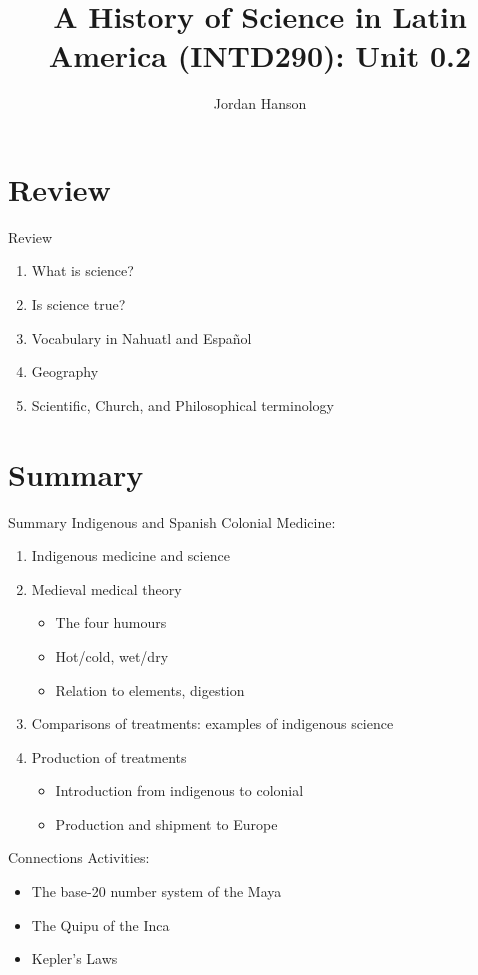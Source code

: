 \documentclass{beamer}
\title{A History of Science in Latin America (INTD290): Unit 0.2}
\author{Jordan Hanson}
\institute{Whittier College Department of Physics and Astronomy}
\begin{document}
\maketitle

\section{Review}

\begin{frame}{Review}
\begin{enumerate}
\item What is science?
\item Is science true?
\item Vocabulary in Nahuatl and Espa\~{n}ol
\item Geography
\item Scientific, Church, and Philosophical terminology
\end{enumerate}
\end{frame}

\section{Summary}

\begin{frame}{Summary}
\alert{Indigenous and Spanish Colonial Medicine}:
\begin{enumerate}
\item Indigenous medicine and science
\item Medieval medical theory
\begin{itemize}
\item The four humours
\item Hot/cold, wet/dry
\item Relation to elements, digestion
\end{itemize}
\item Comparisons of treatments: examples of indigenous science
\item Production of treatments
\begin{itemize}
\item Introduction from indigenous to colonial
\item Production and shipment to Europe
\end{itemize}
\end{enumerate}
\alert{Connections Activities}:
\begin{itemize}
\item The base-20 number system of the Maya
\item The Quipu of the Inca
\item Kepler's Laws
\end{itemize}
\end{frame}
\end{document}
